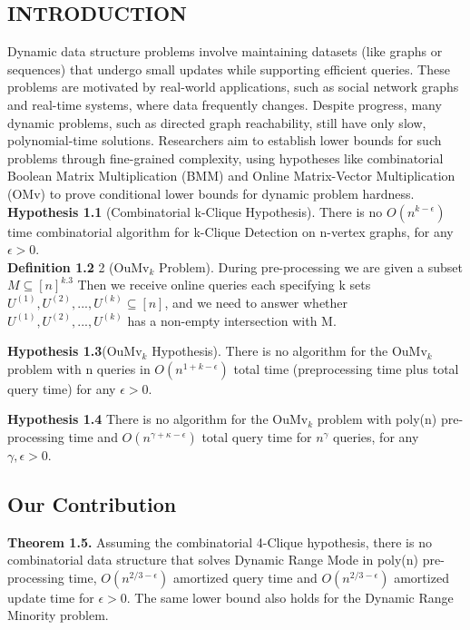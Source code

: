 \documentclass[preprint,10pt]{elsarticle}
\begin{document}
\begin{multicols}{2}
  \section{INTRODUCTION}
  Dynamic data structure problems involve maintaining datasets (like graphs or sequences) that undergo small updates while supporting efficient queries. These problems are motivated by real-world applications, such as social network graphs and real-time systems, where data frequently changes. Despite progress, many dynamic problems, such as directed graph reachability, still have only slow, polynomial-time solutions. Researchers aim to establish lower bounds for such problems through fine-grained complexity, using hypotheses like combinatorial Boolean Matrix Multiplication (BMM) and Online Matrix-Vector Multiplication (OMv) to prove conditional lower bounds for dynamic problem hardness.\\



  \textbf{Hypothesis 1.1}\label{1.1} (Combinatorial k-Clique Hypothesis). There is 
no $O(n^{k-\epsilon})$ time combinatorial algorithm for k-Clique Detection on
n-vertex graphs, for any $\epsilon > 0$.\\
\textbf{Definition 1.2}\label{1.2} 2 (OuMv$_k$ Problem). During pre-processing we are
given a subset $M\subseteq [n]^{k.3}$ Then we receive online queries each
specifying k sets $U^{(1)},U^{(2)},...,U^{(k)} \subseteq [n]$, and we need to answer
whether $U^{(1)},U^{(2)},...,U^{(k)}$ has a non-empty intersection
with M.

\textbf{Hypothesis 1.3}\label{1.3}(OuMv$_k$ Hypothesis). There is no algorithm for
the OuMv$_k$ problem with n queries in $O(n^{1+k-\epsilon})$ total time (preprocessing time plus total query time) for any $\epsilon > 0$.

\textbf{Hypothesis 1.4}\label{1.4} There is no algorithm for the OuMv$_k$ problem with
poly(n) pre-processing time and $O(n^{\gamma+\kappa-\epsilon})$ total query time for $n^{\gamma}$ queries, for any  $\gamma,\epsilon > 0.$

\subsection{\textbf{Our Contribution}}

    \textbf{Theorem 1.5.}\label{1.5} Assuming the combinatorial 4-Clique hypothesis,
there is no combinatorial data structure that solves Dynamic Range
Mode in poly(n) pre-processing time, $O(n^{2/3-\epsilon})$ amortized query
time and  $O(n^{2/3-\epsilon})$ amortized update time for  $\epsilon>0$. The same lower
bound also holds for the Dynamic Range Minority problem.\\


\end{multicols}
\end{document}
